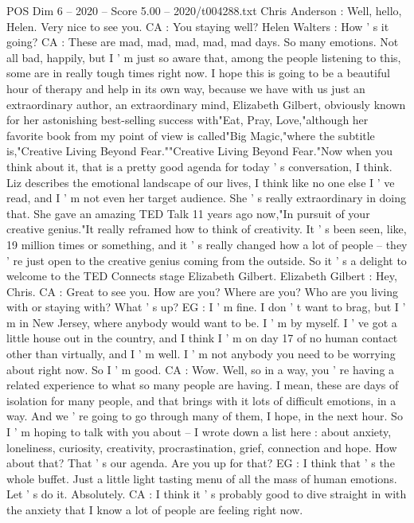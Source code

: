 \begin{textsample}{POS Dim 6 – 2020 – Score 5.00 – 2020/t004288.txt}  \label{ex:f6_pos_054}
Chris Anderson : Well, hello, Helen.
Very nice to see you.
CA : You staying well?
Helen Walters : How ' s it going?
CA : These are mad, mad, mad, mad, mad days.
So many emotions.
Not all bad, happily, but I ' m just so aware that, among the people listening to this, some are in really tough times right now.
I hope this is going to be a beautiful hour of therapy and help in its own way, because we have with us just an extraordinary author, an extraordinary mind, Elizabeth Gilbert, obviously known for her astonishing best-selling success with"Eat, Pray, Love,"although her favorite book from my point of view is called"Big Magic,"where the subtitle is,"Creative Living Beyond Fear.""Creative Living Beyond Fear."Now when you think about it, that is a pretty good agenda for today ' s conversation, I think.
Liz describes the emotional landscape of our lives, I think like no one else I ' ve read, and I ' m not even her target audience.
She ' s really extraordinary in doing that.
She gave an amazing TED Talk 11 years ago now,"In pursuit of your creative genius."It really reframed how to think of creativity.
It ' s been seen, like, 19 million times or something, and it ' s really changed how a lot of people -- they ' re just open to the creative genius coming from the outside.
So it ' s a delight to welcome to the TED Connects stage Elizabeth Gilbert.
Elizabeth Gilbert : Hey, Chris.
CA : Great to see you.
How are you?
Where are you?
Who are you living with or staying with?
What ' s up?
EG : I ' m fine.
I don ' t want to brag, but I ' m in New Jersey, where anybody would want to be.
I ' m by myself.
I ' ve got a little house out in the country, and I think I ' m on day 17 of no human contact other than virtually, and I ' m well.
I ' m not anybody you need to be worrying about right now.
So I ' m good.
CA : Wow.
Well, so in a way, you ' re having a related experience to what so many people are having.
I mean, these are days of isolation for many people, and that brings with it lots of difficult emotions, in a way.
And we ' re going to go through many of them, I hope, in the next hour.
So I ' m hoping to talk with you about -- I wrote down a list here : about anxiety, loneliness, curiosity, creativity, procrastination, grief, connection and hope.
How about that?
That ' s our agenda.
Are you up for that?
EG : I think that ' s the whole buffet.
Just a little light tasting menu of all the mass of human emotions.
Let ' s do it.
Absolutely.
CA : I think it ' s probably good to dive straight in with the anxiety that I know a lot of people are feeling right now.

\end{textsample}
